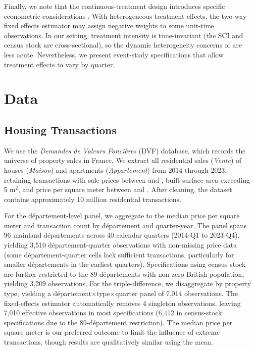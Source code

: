 \documentclass[12pt]{article}
\begin{document}
Finally, we note that the continuous-treatment design introduces specific econometric considerations \citep{callaway2021difference}. With heterogeneous treatment effects, the two-way fixed effects estimator may assign negative weights to some unit-time observations. In our setting, treatment intensity is time-invariant (the SCI and census stock are cross-sectional), so the dynamic heterogeneity concerns of \citet{sun2021estimating} are less acute. Nevertheless, we present event-study specifications that allow treatment effects to vary by quarter.


\section{Data}\label{sec:data}

\subsection{Housing Transactions}

We use the \textit{Demandes de Valeurs Fonci\`eres} (DVF) database, which records the universe of property sales in France. We extract all residential sales (\textit{Vente}) of houses (\textit{Maison}) and apartments (\textit{Appartement}) from 2014 through 2023, retaining transactions with sale prices between  and , built surface area exceeding 5 m$^2$, and price per square meter between  and . After cleaning, the dataset contains approximately 10 million residential transactions.

For the d\'epartement-level panel, we aggregate to the median price per square meter and transaction count by d\'epartement and quarter-year. The panel spans 96 mainland d\'epartements across 40 calendar quarters (2014-Q1 to 2023-Q4), yielding 3,510 d\'epartement-quarter observations with non-missing price data (some d\'epartement-quarter cells lack sufficient transactions, particularly for smaller d\'epartements in the earliest quarters). Specifications using census stock are further restricted to the 89 d\'epartements with non-zero British population, yielding 3,209 observations. For the triple-difference, we disaggregate by property type, yielding a d\'epartement$\times$type$\times$quarter panel of 7,014 observations. The fixed-effects estimator automatically removes 4 singleton observations, leaving 7,010 effective observations in most specifications (6,412 in census-stock specifications due to the 89-d\'epartement restriction). The median price per square meter is our preferred outcome to limit the influence of extreme transactions, though results are qualitatively similar using the mean.
\end{document}
